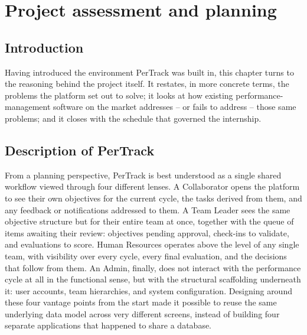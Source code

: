 \documentclass[12pt,a4paper]{report}
\begin{document}
\clearpage


\chapter{Project assessment and planning}
\label{ch:assessment}

\section{Introduction}

Having introduced the environment PerTrack was built in, this chapter turns to the reasoning behind the project itself. It restates, in more concrete terms, the problems the platform set out to solve; it looks at how existing performance-management software on the market addresses -- or fails to address -- those same problems; and it closes with the schedule that governed the internship.

\section{Description of PerTrack}

From a planning perspective, PerTrack is best understood as a single shared workflow viewed through four different lenses. A Collaborator opens the platform to see their own objectives for the current cycle, the tasks derived from them, and any feedback or notifications addressed to them. A Team Leader sees the same objective structure but for their entire team at once, together with the queue of items awaiting their review: objectives pending approval, check-ins to validate, and evaluations to score. Human Resources operates above the level of any single team, with visibility over every cycle, every final evaluation, and the decisions that follow from them. An Admin, finally, does not interact with the performance cycle at all in the functional sense, but with the structural scaffolding underneath it: user accounts, team hierarchies, and system configuration. Designing around these four vantage points from the start made it possible to reuse the same underlying data model across very different screens, instead of building four separate applications that happened to share a database.
\end{document}
